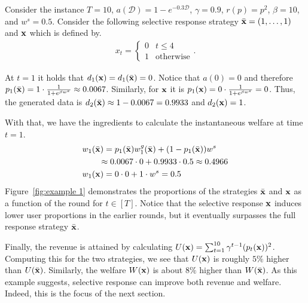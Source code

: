 \begin{example}\label{example}
\normalfont
Consider the instance $T = 10$, $a(\mathcal{D}) = 1-e^{-0.3 \mathcal{D}}$, $\gamma = 0.9$, $r(p) = p^2$, $\beta = 10$, and $w^s = 0.5$. Consider the following selective response strategy $\Bar{{\bf{x}}} = (1, \ldots, 1)$ and ${\bf{x}}$ which is defined by.
\begin{align*}
x_t = \begin{cases}
    0 & \mbox{$t \leq 4$} \\
    1 & \mbox{otherwise}
\end{cases}.
\end{align*}

At $t = 1$ it holds that $d_1({\bf{x}}) = d_1(\Bar{{\bf{x}}}) = 0$. Notice that $a(0) = 0$ and therefore $p_1(\Bar{{\bf{x}}}) = 1 \cdot \frac{1}{1 + e^{\beta w^s}}  \approx 0.0067$.
Similarly, for ${\bf{x}}$ it is $p_1({\bf{x}}) = 0 \cdot \frac{1}{1 + e^{\beta w^s}} = 0$. Thus, the generated data is $d_2(\Bar{{\bf{x}}}) \approx 1-0.0067 = 0.9933$ and $d_2({\bf{x}}) = 1$.

With that, we have the ingredients to calculate the instantaneous welfare at time $t = 1$. 
\begin{align*}
    & w_1(\Bar{{\bf{x}}}) = p_1(\Bar{{\bf{x}}}) w^g_1(\Bar{{\bf{x}}}) + (1-p_1(\Bar{{\bf{x}}}))w^s \\
    & \qquad \approx 0.0067 \cdot 0 + 0.9933 \cdot 0.5 \approx 0.4966 \\
    & w_1({\bf{x}}) = 0 \cdot 0 + 1 \cdot w^s = 0.5
\end{align*}
Figure~\ref{fig:example 1} demonstrates the proportions of the strategies $\Bar{{\bf{x}}}$ and ${\bf{x}}$ as a function of the round for $t \in [T]$. Notice that the selective response ${\bf{x}}$ induces lower user proportions in the earlier rounds, but it eventually surpasses the full response strategy $\Bar{{\bf{x}}}$.


Finally, the revenue is attained by calculating $U({\bf{x}}) = \sum_{t = 1}^{10} \gamma^{t-1} (p_t({\bf{x}}))^2$. Computing this for the two strategies, we see that $U({\bf{x}})$ is roughly $5\%$ higher than $U(\Bar{{\bf{x}}})$. Similarly, the welfare $W({\bf{x}})$ is about $8\%$ higher than $W(\Bar{{\bf{x}}})$. As this example suggests, selective response can improve both revenue and welfare. Indeed, this is the focus of the next section.
\end{example}